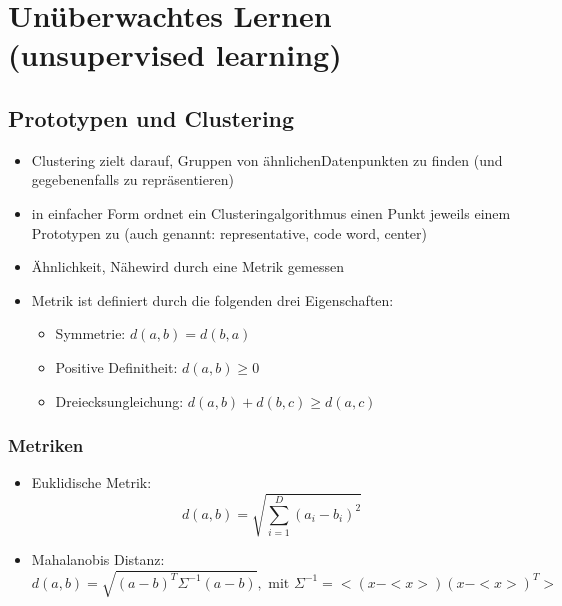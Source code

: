 	\section{Unüberwachtes Lernen (unsupervised learning)}
	\subsection{Prototypen und Clustering}
	\begin{itemize}
		\item Clustering zielt darauf, Gruppen von \dq ähnlichen\dq Datenpunkten zu finden (und gegebenenfalls zu repräsentieren)
		\item in einfacher Form ordnet ein Clusteringalgorithmus einen Punkt jeweils einem Prototypen zu (auch genannt: representative, code word, center)
		\item \dq Ähnlichkeit, Nähe\dq wird durch eine Metrik gemessen
		\item Metrik ist definiert durch die folgenden drei Eigenschaften:
		\begin{itemize}
			\item Symmetrie: $d(a,b) = d(b,a)$
			\item Positive Definitheit: $d(a,b)\ge0$
			\item Dreiecksungleichung: $d(a,b) + d(b,c) \ge d(a,c)$
		\end{itemize}
	\end{itemize}
	\subsubsection{Metriken}
	\begin{itemize}
		\item Euklidische Metrik:
		\begin{equation*}
			d(a,b) = \sqrt{\sum_{i=1}^D(a_i-b_i)^2}
		\end{equation*}
		\item Mahalanobis Distanz:
		\begin{equation*}
			d(a,b) =\sqrt{(a-b)^T\Sigma^{-1}(a-b)}, \text{ mit } \Sigma^{-1} = <(x-<x>)(x-<x>)^T>
		\end{equation*}
	\end{itemize}

